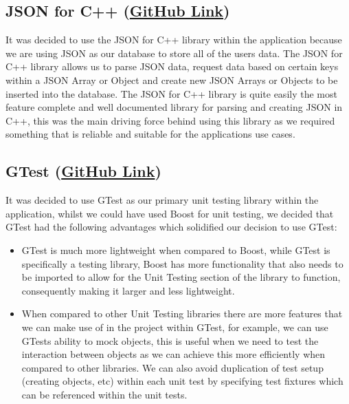 \documentclass[
  english,
  a4paper,
,tablecaptionabove
]{scrartcl}
\providecommand{\tightlist}{%
  \setlength{\itemsep}{0pt}\setlength{\parskip}{0pt}}
\begin{document}
\hypertarget{json-for-c-github-link}{%
\subsection{\texorpdfstring{JSON for C++
(\href{https://github.com/nlohmann/json}{GitHub
Link})}{JSON for C++ (GitHub Link)}}\label{json-for-c-github-link}}

It was decided to use the JSON for C++ library within the application
because we are using JSON as our database to store all of the users
data. The JSON for C++ library allows us to parse JSON data, request
data based on certain keys within a JSON Array or Object and create new
JSON Arrays or Objects to be inserted into the database. The JSON for
C++ library is quite easily the most feature complete and well
documented library for parsing and creating JSON in C++, this was the
main driving force behind using this library as we required something
that is reliable and suitable for the applications use cases.

\hypertarget{gtest-github-link}{%
\subsection{\texorpdfstring{GTest
(\href{https://github.com/google/googletest}{GitHub
Link})}{GTest (GitHub Link)}}\label{gtest-github-link}}

It was decided to use GTest as our primary unit testing library within
the application, whilst we could have used Boost for unit testing, we
decided that GTest had the following advantages which solidified our
decision to use GTest:

\begin{itemize}
\tightlist
\item
  GTest is much more lightweight when compared to Boost, while GTest is
  specifically a testing library, Boost has more functionality that also
  needs to be imported to allow for the Unit Testing section of the
  library to function, consequently making it larger and less
  lightweight.
\item
  When compared to other Unit Testing libraries there are more features
  that we can make use of in the project within GTest, for example, we
  can use GTests ability to mock objects, this is useful when we need to
  test the interaction between objects as we can achieve this more
  efficiently when compared to other libraries. We can also avoid
  duplication of test setup (creating objects, etc) within each unit
  test by specifying test fixtures which can be referenced within the
  unit tests.
\end{itemize}
\end{document}
